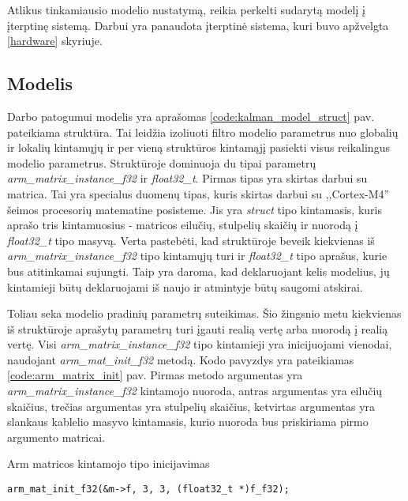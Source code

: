 Atlikus tinkamiausio modelio nustatymą, reikia perkelti sudarytą modelį į įterptinę sistemą.
Darbui yra panaudota įterptinė sistema, kuri buvo apžvelgta \ref{hardware} skyriuje.

\subsection{Modelis}

Darbo patogumui modelis yra aprašomas \ref{code:kalman_model_struct} pav. pateikiama struktūra. 
Tai leidžia izoliuoti filtro modelio parametrus nuo globalių ir lokalių kintamųjų ir per vieną struktūros kintamąjį pasiekti visus reikalingus modelio parametrus.
Struktūroje dominuoja du tipai parametrų \textit{arm\_matrix\_instance\_f32} ir \textit{float32\_t}.
Pirmas tipas yra skirtas darbui su matrica.
Tai yra specialus duomenų tipas, kuris skirtas darbui su ,,Cortex-M4'' šeimos procesorių matematine posisteme.
Jis yra \textit{struct} tipo kintamasis, kuris aprašo tris kintamuosius - matricos eilučių, stulpelių skaičių ir nuorodą į \textit{float32\_t} tipo masyvą.
Verta pastebėti, kad struktūroje beveik kiekvienas iš \textit{arm\_matrix\_instance\_f32} tipo kintamųjų turi ir \textit{float32\_t} tipo aprašus, kurie bus atitinkamai sujungti.
Taip yra daroma, kad deklaruojant kelis modelius, jų kintamieji būtų deklaruojami iš naujo ir atmintyje būtų saugomi atskirai.

Toliau seka modelio pradinių parametrų suteikimas.
Šio žingsnio metu kiekvienas iš struktūroje aprašytų parametrų turi įgauti realią vertę arba nuorodą į realią vertę.
Visi \textit{arm\_matrix\_instance\_f32} tipo kintamieji yra inicijuojami vienodai, naudojant \textit{arm\_mat\_init\_f32} metodą.
Kodo pavyzdys yra pateikiamas \ref{code:arm_matrix_init} pav.
Pirmas metodo argumentas yra \textit{arm\_matrix\_instance\_f32} kintamojo nuoroda, antras argumentas yra eilučių skaičius, trečias argumentas yra stulpelių skaičius, ketvirtas argumentas yra slankaus kablelio masyvo kintamasis, kurio nuoroda bus priskiriama pirmo argumento matricai.

\begin{cfigure}[b]
    \centering
    \caption{Arm matricos kintamojo tipo inicijavimas}
    \label{code:arm_matrix_init}
    \begin{lstlisting}
arm_mat_init_f32(&m->f, 3, 3, (float32_t *)f_f32);
    \end{lstlisting}
\end{cfigure}

